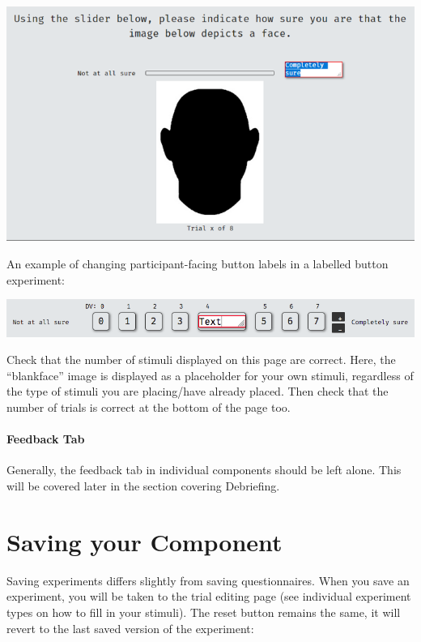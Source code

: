 \documentclass[]{book}
\let\oldparagraph\paragraph
\renewcommand{\paragraph}[1]{\oldparagraph{#1}\mbox{}}
\begin{document}
\includegraphics{images/screenshots/exp_10.png}

An example of changing participant-facing button labels in a labelled
button experiment:

\includegraphics{images/screenshots/exp_11.png}

Check that the number of stimuli displayed on this page are correct.
Here, the ``blankface'' image is displayed as a placeholder for your own
stimuli, regardless of the type of stimuli you are placing/have already
placed. Then check that the number of trials is correct at the bottom of
the page too.

\paragraph{Feedback Tab}\label{feedback-tab-1}

Generally, the feedback tab in individual components should be left
alone. This will be covered later in the section covering Debriefing.

\section{Saving your Component}\label{saving-your-component}

Saving experiments differs slightly from saving questionnaires. When you
save an experiment, you will be taken to the trial editing page (see
individual experiment types on how to fill in your stimuli). The reset
button remains the same, it will revert to the last saved version of the
experiment:
\end{document}
